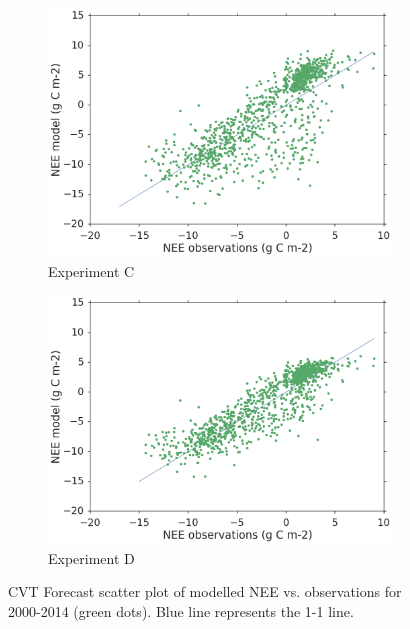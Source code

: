 \documentclass[11pt]{article}
\begin{document}
\begin{figure}
\begin{subfigure}[b]{0.49\textwidth}
        \includegraphics[width=\textwidth]{Cfscatcvt.png}
        \caption{Experiment C}
        \label{fig:forecastscatBcorR}
    \end{subfigure}
    \begin{subfigure}[b]{0.49\textwidth}
        \includegraphics[width=\textwidth]{Dfscatcvt.png}
        \caption{Experiment D}
        \label{fig:forecastscatedcBcorR}
    \end{subfigure}
    \caption{CVT Forecast scatter plot of modelled NEE vs. observations for 2000-2014 (green dots). Blue line represents the 1-1 line.}\label{fig:animals}
\end{figure}
\end{document}
